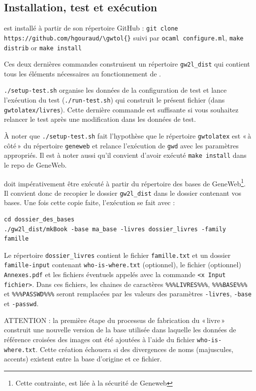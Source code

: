 \subsection{Installation, test et exécution}

\gwtol{} est installé à partir de son répertoire GitHub :
\verb|git clone https://github.com/hgouraud/\gwtol{}|
suivi par
\verb|ocaml configure.ml|, \verb|make distrib| or \verb|make install|

Ces deux dernières commandes construisent un répertoire \verb|gw2l_dist| qui
contient tous les éléments nécessaires au fonctionnement de \gwtol{}.

\verb|./setup-test.sh| organise les données de la configuration de test et
lance l'exécution du test (\verb|./run-test.sh|) qui construit le présent
fichier (dans \verb|gwtolatex/livres|). Cette dernière commande est
suffisante si vous souhaitez relancer le test après une modification
dans les données de test.

À noter que \verb|./setup-test.sh| fait l'hypothèse que le répertoire
\verb|gwtolatex| est «\,à côté\,» du répertoire \verb|geneweb| et relance
l'exécution de \verb|gwd| avec les paramètres appropriés. Il est à noter
aussi qu'il convient d'avoir exécuté \verb|make install| dans le repo de GeneWeb.

\gwtol{} doit impérativement être exécuté à partir du répertoire des bases de
GeneWeb\footnote{Cette contrainte, est liée à la sécurité de Geneweb}.
Il convient donc de recopier le dossier \verb|gw2l_dist| dans le
dossier contenant vos bases. Une fois cette copie faite, l'exécution se
fait avec :
\begin{verbatim}
cd dossier_des_bases
./gw2l_dist/mkBook -base ma_base -livres dossier_livres -family famille
\end{verbatim}

Le répertoire \verb|dossier_livres| contient le fichier \verb|famille.txt|
et un dossier
\verb|famille-input| contenant \verb|who-is-where.txt| (optionnel),
le fichier (optionnel) \verb|Annexes.pdf|
et les fichiers éventuels appelés avec la commande \verb|<x Input fichier>|.
Dans ces fichiers, les chaines de caractères \verb|%%%LIVRES%%%|,
\verb|%%%BASE%%%| et \verb|%%%PASSWD%%%| seront remplacées par les valeurs
des paramètres \verb|-livres|, \verb|-base| et \verb|-passwd|.

ATTENTION : la première étape du processus de fabrication du «\,livre\,»
construit une nouvelle version de la base utilisée dans laquelle les
données de référence croisées des images ont été ajoutées à l'aide du
fichier \verb|who-is-where.txt|.
Cette création échouera si des divergences de noms (majuscules, accents)
existent entre la base d'origine et ce fichier.

